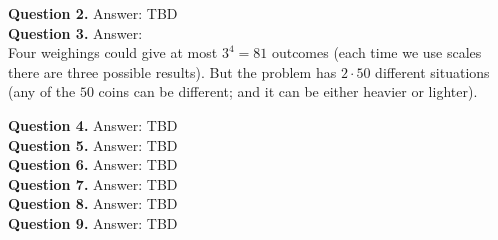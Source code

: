 \documentclass[jou]{apa6}
\begin{document}
\vspace{10pt}
{\bf Question 2.} Answer: TBD \\

\vspace{10pt}
{\bf Question 3.} Answer:\\

Four weighings could give at most $3^4 = 81$ outcomes (each time we use scales there are
three possible results). But the problem has $2 \cdot 50$ different situations
(any of the $50$ coins can be different; and it can be either heavier or lighter). 

\vspace{10pt}
{\bf Question 4.} Answer: TBD \\

\vspace{10pt}
{\bf Question 5.} Answer: TBD \\

\vspace{10pt}
{\bf Question 6.} Answer: TBD \\

\vspace{10pt}
{\bf Question 7.} Answer: TBD \\

\vspace{10pt}
{\bf Question 8.} Answer: TBD \\

\vspace{10pt}
{\bf Question 9.} Answer: TBD \\
\end{document}
